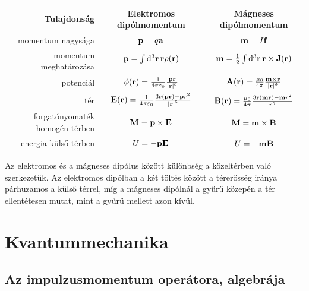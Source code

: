    \begin{center}
    \begin{tabular}{r||c|c}
     Tulajdonság & Elektromos dipólmomentum & Mágneses dipólmomentum \\ \hline
      momentum nagysága & $\mathbf{p}=q\mathbf{a}$ & $\mathbf{m}=I\mathbf{f}$ \\
      momentum meghatározása & $\mathbf{p}=\int\limits_{}^{}\mathrm{d}^3\mathbf{r}\,\mathbf{r}\rho(\mathbf{r})$ & $\mathbf{m}=\frac{1}{2}\int\limits_{}^{}\mathrm{d}^3\mathbf{r}\,\mathbf{r}\times\mathbf{J}(\mathbf{r})$ \\
      potenciál & $\phi(\mathbf{r})=\frac{1}{4\pi\varepsilon_0}\frac{\mathbf{p}\mathbf{r}}{\left\lvert\mathbf{r}\right\rvert^3}$ & $\mathbf{A}(\mathbf{r})=\frac{\mu_0}{4\pi}\frac{\mathbf{m}\times\mathbf{r}}{\left\lvert\mathbf{r}\right\rvert^{3}}$ \\
      tér & $\mathbf{E}(\mathbf{r})=\frac{1}{4\pi\varepsilon_0}\frac{3\mathbf{r}(\mathbf{p}\mathbf{r})-\mathbf{p} r^2}{\left\lvert\mathbf{r}\right\rvert^5}$ & $\mathbf{B}(\mathbf{r})=\frac{\mu_0}{4\pi}\frac{3\mathbf{r}(\mathbf{m}\mathbf{r})-\mathbf{m} r^2}{r^5}$ \\
      forgatónyomaték homogén térben & $\mathbf{M}=\mathbf{p}\times\mathbf{E}$ & $\mathbf{M}=\mathbf{m}\times\mathbf{B}$ \\
      energia külső térben & $U=-\mathbf{p}\mathbf{E}$ & $U=-\mathbf{m}\mathbf{B}$
    \end{tabular}
   \end{center}
   
   Az elektromos és a mágneses dipólus között különbség a közeltérben való szerkezetük. Az elektromos dipólban a két töltés között a térerősség iránya párhuzamos a külső térrel, míg a mágneses dipólnál a gyűrű közepén a tér ellentétesen mutat, mint a gyűrű mellett azon kívül.

   
 \section{Kvantummechanika}
  
  \subsection{Az impulzusmomentum operátora, algebrája}
  
